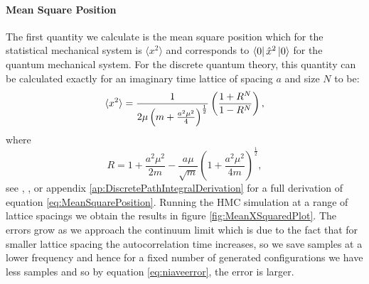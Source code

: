 \documentclass[12pt]{article}
\begin{document}
            \paragraph{Mean Square Position}
                The first quantity we calculate is the mean square position which for the statistical mechanical system is $\langle x^2 \rangle$ and corresponds to $\bra{0}\hat{x}^2\ket{0}$ for the quantum mechanical system. For the discrete quantum theory, this quantity can be calculated exactly for an imaginary time lattice of spacing $a$ and size $N$ to be: 
                \begin{equation}
                    \label{eq:MeanSquarePosition}
                    \braket{x^2} = \frac{1}{2\mu\left(m+\frac{a^2\mu^2}{4}\right)^\frac{1}{2}}\left(\frac{1+R^N}{1-R^N}\right),
                \end{equation}
                where
                \begin{equation}
                    \label{eq:R}
                    R = 1 + \frac{a^2\mu^2}{2m} - \frac{a\mu}{\sqrt{m}}\left( 1 + \frac{a^2\mu^2}{4m}\right)^{\frac{1}{2}},
                \end{equation}
                see \cite{creutz_freedman_1981}, \cite{slapik_serenone}, \cite{westbroek_king_vvedensky_durr_2017} or appendix \ref{ap:DiscretePathIntegralDerivation} for a full derivation of equation \ref{eq:MeanSquarePosition}. Running the HMC simulation at a range of lattice spacings we obtain the results in figure \ref{fig:MeanXSquaredPlot}. The errors grow as we approach the continuum limit which is due to the fact that for smaller lattice spacing the autocorrelation time increases, so we save samples at a lower frequency and hence for a fixed number of generated configurations we have less samples and so by equation \ref{eq:niaveerror}, the error is larger.
\end{document}
